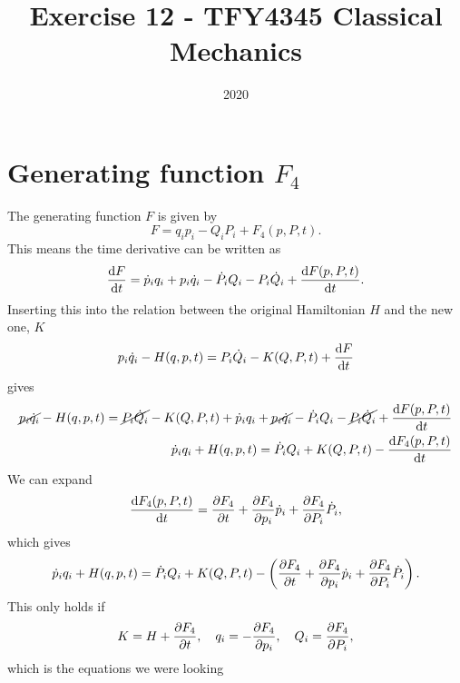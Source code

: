 \documentclass{article}
\title{Exercise 12 - TFY4345 Classical Mechanics}
\date{2020}
\begin{document}
    \maketitle
    \section{Generating function $F_4$}
    The generating function $F$ is given by
    \begin{equation*}
        F = q_ip_i - Q_iP_i + F_4(p, P, t).
    \end{equation*}
    This means the time derivative can be written as
    \begin{equation*}
        \dv{F}{t} = \dot p_i q_i + p_i \dot q_i - \dot P_i Q_i - P_i \dot Q_i + \dv{F(p, P, t)}{t}.
    \end{equation*}
    Inserting this into the relation between the original Hamiltonian $H$ and the new one, $K$
    \begin{equation*}
        p_i \dot q_i - H(q, p, t) = P_i \dot Q_i - K(Q, P, t) + \dv{F}{t}
    \end{equation*}
    gives
    \begin{align*}
        \cancel{p_i \dot q_i} - H(q, p, t) = \cancel{P_i \dot Q_i} - K(Q, P, t) + \dot p_i q_i + \cancel{p_i \dot q_i} - \dot P_i Q_i - \cancel{P_i \dot Q_i} + \dv{F(p, P, t)}{t} \\
        \dot p_i q_i  + H(q, p, t) =  \dot P_i Q_i + K(Q, P, t) - \dv{F_4(p, P, t)}{t} 
    \end{align*}
    We can expand 
    \begin{equation*}
        \dv{F_4(p, P, t)}{t} = \pdv{F_4}{t} + \pdv{F_4}{p_i} \dot p_i +  \pdv{F_4}{P_i} \dot P_i,
    \end{equation*}
    which gives
    \begin{equation*}
        \dot p_i q_i  + H(q, p, t) =  \dot P_i Q_i + K(Q, P, t) - \left(\pdv{F_4}{t} + \pdv{F_4}{p_i} \dot p_i +  \pdv{F_4}{P_i} \dot P_i\right).
    \end{equation*}
    This only holds if
    \begin{equation*}
        K = H + \pdv{F_4}{t}, \quad q_i = - \pdv{F_4}{p_i}, \quad Q_i = \pdv{F_4}{P_i},
    \end{equation*}
    which is the equations we were looking
        
\end{document}
